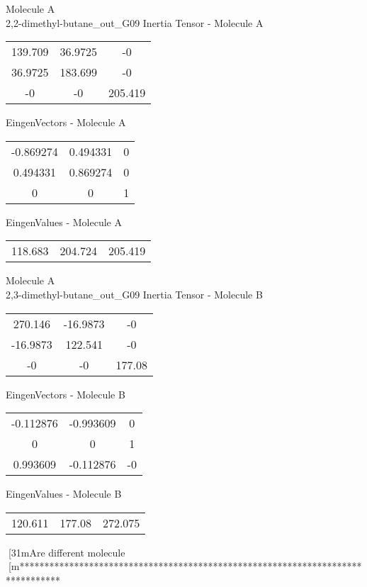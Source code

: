 \begin{multicols}{2}
\begin{center}
Molecule A \\ 
2,2-dimethyl-butane_out_G09
Inertia Tensor - Molecule A \\
\vtab
\begin{tabular}{|c c c|}
139.709	 & 	36.9725	 & 	-0	 \\
36.9725	 & 	183.699	 & 	-0	 \\
-0	 & 	-0	 & 	205.419
\end{tabular}

\vtab
 EingenVectors - Molecule A     \\
\vtab
\begin{tabular}{|c c c|}
-0.869274	 & 	0.494331	 & 	0	 \\
0.494331	 & 	0.869274	 & 	0	 \\
0	 & 	0	 & 	1
\end{tabular}

\vtab
 EingenValues - Molecule A     \\
\vtab
\begin{tabular}{|c c c|}
118.683	 & 	204.724	 & 	205.419
\end{tabular}
\columnbreak
Molecule A \\ 
2,3-dimethyl-butane_out_G09
Inertia Tensor - Molecule B \\
\vtab
\begin{tabular}{|c c c|}
270.146	 & 	-16.9873	 & 	-0	 \\
-16.9873	 & 	122.541	 & 	-0	 \\
-0	 & 	-0	 & 	177.08
\end{tabular}

\vtab
 EingenVectors - Molecule B     \\
\vtab
\begin{tabular}{|c c c|}
-0.112876	 & 	-0.993609	 & 	0	 \\
0	 & 	0	 & 	1	 \\
0.993609	 & 	-0.112876	 & 	-0
\end{tabular}

\vtab
 EingenValues - Molecule B     \\
\vtab
\begin{tabular}{|c c c|}
120.611	 & 	177.08	 & 	272.075
\end{tabular}
\end{center}
\end{multicols}
[31mAre different molecule
[m********************************************************************************
